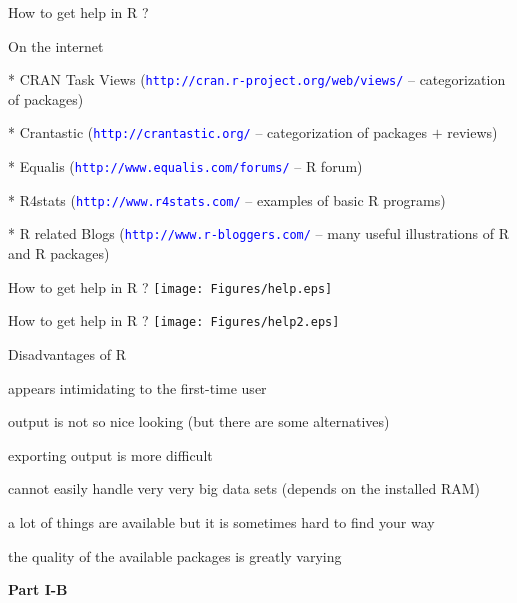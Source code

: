 \documentclass{presentatiesmetlogo}
\newcommand{\code}[1]{\textcolor{blue}{\texttt{#1}}}
\newcommand{\R}{{\textsf{R} }}
\begin{document}
\bitem
\item How to get help in \R ?
\bitemt
\item On the internet
\bitemt
\item[*] CRAN Task Views (\code{http://cran.r-project.org/web/views/}
-- categorization of packages)
\item[*] Crantastic (\code{http://crantastic.org/} -- categorization of
packages $+$ reviews)
\item[*] Equalis (\code{http://www.equalis.com/forums/} --
\textsf{R} forum)
\item[*] R4stats (\code{http://www.r4stats.com/} -- examples of basic \textsf{R} programs)
\item[*] R related Blogs (\code{http://www.r-bloggers.com/} -- many useful illustrations of \textsf{R} and \textsf{R} packages)
\eitemt
\eitemt
\eitem
\bitem
\item How to get help in \R ?
\eitem
\texttt{[image: Figures/help.eps]}
\bitem
\item How to get help in \R ?
\eitem
\texttt{[image: Figures/help2.eps]}
\bitem
\item Disadvantages of \R
\bitemt
\item appears intimidating to the first-time user
\item output is not so nice looking (but there are some alternatives)
\item exporting output is more difficult
\item cannot easily handle very very big data sets (depends on
the installed RAM)
\item a lot of things are available but it is sometimes hard to
find your way
\item the quality of the available packages is greatly varying
\eitemt
\eitem
\newpage
\mbox{ }
\vspace{5cm}
\begin{center}
{\Huge \textbf{Part I-B}}
\end{center}
\end{document}
